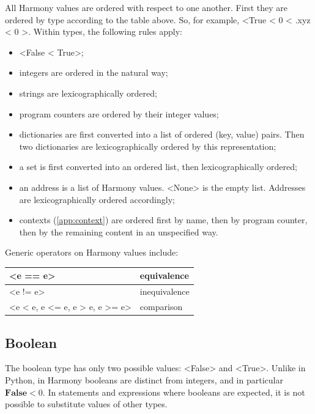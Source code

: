 \documentclass{report}
\begin{document}
All Harmony values are ordered with respect to one another.  First they
are ordered by type according to the table above.
So, for example, <{True < 0 < .xyz < { 0 }}>.
Within types, the following rules apply:

\begin{itemize}
\item <{False < True}>;
\item integers are ordered in the natural way;
\item strings are lexicographically ordered;
\item program counters are ordered by their integer values;
\item dictionaries are first converted into a list of ordered (key, value)
pairs.  Then two dictionaries are lexicographically ordered by this
representation;
\item a set is first converted into an ordered list, then lexicographically
ordered;
\item an address is a list of Harmony values.  <{None}> is the empty list.
Addresses are lexicographically ordered accordingly;
\item contexts (\autoref{app:context}) are ordered first by name, then by program counter, then by the remaining content in an unspecified way.
\end{itemize}

Generic operators on Harmony values include:

\begin{center}
\begin{tabular}{|l|l|}
\hline
<{e == e}> & equivalence \\
\hline
<{e != e}> & inequivalence \\
\hline
<{e < e, e <= e, e > e, e >= e}> & comparison\\
\hline
\end{tabular}
\end{center}

\subsection*{Boolean}

The boolean type has only two possible values: <{False}> and
<{True}>.  Unlike in Python, in Harmony booleans are distinct
from integers, and in particular $\mathbf{False} < 0$.  In statements
and expressions where booleans are expected, it is not possible to
substitute values of other types.
\end{document}
